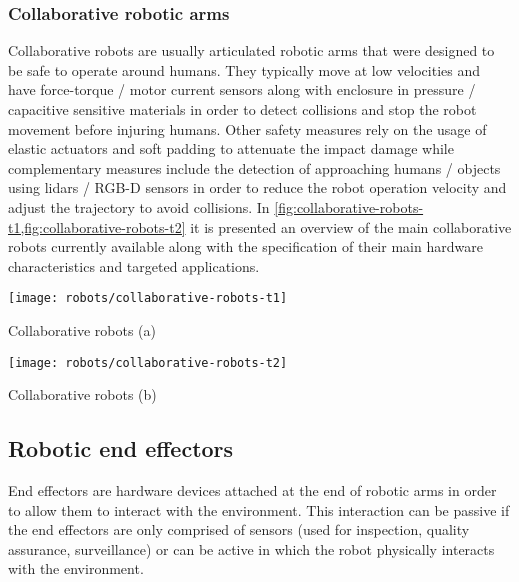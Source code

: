 \subsubsection{Collaborative robotic arms}

Collaborative robots are usually articulated robotic arms that were designed to be safe to operate around humans. They typically move at low velocities and have force-torque / motor current sensors along with enclosure in pressure / capacitive sensitive materials in order to detect collisions and stop the robot movement before injuring humans. Other safety measures rely on the usage of elastic actuators and soft padding to attenuate the impact damage while complementary measures include the detection of approaching humans / objects using \glspl{lidar} / RGB-D sensors in order to reduce the robot operation velocity and adjust the trajectory to avoid collisions. In \cref{fig:collaborative-robots-t1,fig:collaborative-robots-t2} it is presented an overview of the main collaborative robots currently available along with the specification of their main hardware characteristics and targeted applications.



\begin{table}[H]
	\centering
	\texttt{[image: robots/collaborative-robots-t1]}
	\caption[Collaborative robots (a)]{Collaborative robots (a) \cite{Mathieu2015}}
	\label{fig:collaborative-robots-t1}
\end{table}

\begin{table}[H]
	\centering
	\texttt{[image: robots/collaborative-robots-t2]}
	\caption[Collaborative robots (b)]{Collaborative robots (b) \cite{Mathieu2015}}
	\label{fig:collaborative-robots-t2}
\end{table}


\subsection{Robotic end effectors}

End effectors are hardware devices attached at the end of robotic arms in order to allow them to interact with the environment. This interaction can be passive if the end effectors are only comprised of sensors (used for inspection, quality assurance, surveillance) or can be active in which the robot physically interacts with the environment.

